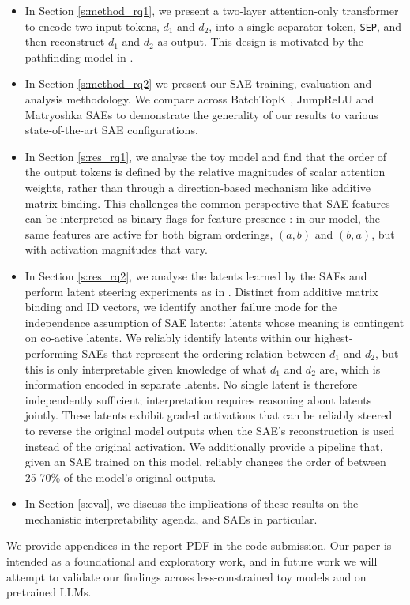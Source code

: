 \begin{itemize}
    \item In Section \ref{s:method_rq1}, we present a two-layer attention-only transformer to encode two input tokens, $d_1$ and $d_2$, into a single separator token, \texttt{SEP}, and then reconstruct $d_1$ and $d_2$ as output. This design is motivated by the pathfinding model in \citet{brinkmann2024mechanistic}. 
    \item In Section \ref{s:method_rq2} we present our SAE training, evaluation and analysis methodology. We compare across BatchTopK \cite{bussmann2024batchtopk}, JumpReLU \cite{rajamanoharan2024jumping} and Matryoshka SAEs \cite{bussmann2025learning} to demonstrate the generality of our results to various state-of-the-art SAE configurations.
    \item In Section \ref{s:res_rq1}, we analyse the toy model and find that the order of the output tokens is defined by the relative magnitudes of scalar attention weights, rather than through a direction-based mechanism like additive matrix binding. This challenges the common perspective that SAE features can be interpreted as binary flags for feature presence \citep{quirke2025binary, paulo2024automatically}: in our model, the same features are active for both bigram orderings, $(a, b)$ and $(b, a)$, but with activation magnitudes that vary.
    \item In Section \ref{s:res_rq2}, we analyse the latents learned by the SAEs and perform latent steering experiments as in \citet{arditi2024refusal}. Distinct from additive matrix binding and ID vectors, we identify another failure mode for the independence assumption of SAE latents: latents whose meaning is contingent on co-active latents. We reliably identify latents within our highest-performing SAEs that represent the ordering relation between $d_1$ and $d_2$, but this is only interpretable given knowledge of what $d_1$ and $d_2$ are, which is information encoded in separate latents. No single latent is therefore independently sufficient; interpretation requires reasoning about latents jointly. These latents exhibit graded activations that can be reliably steered to reverse the original model outputs when the SAE's reconstruction is used instead of the original activation. We additionally provide a pipeline that, given an SAE trained on this model, reliably changes the order of between 25-70\% of the model's original outputs.
    \item In Section \ref{s:eval}, we discuss the implications of these results on the mechanistic interpretability agenda, and SAEs in particular.
\end{itemize}

We provide appendices in the report PDF in the code submission.
Our paper is intended as a foundational and exploratory work, and in future work we will attempt to validate our findings across less-constrained toy models and on pretrained LLMs. 
